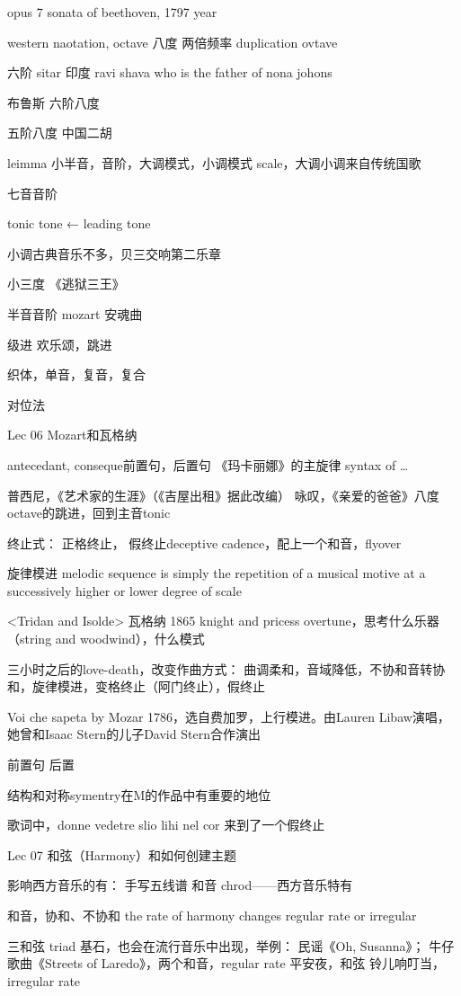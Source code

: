 opus 7 sonata of beethoven, 1797 year

western naotation, octave 八度 两倍频率 duplication ovtave

六阶 sitar 印度 ravi shava who is the father of nona johons

布鲁斯 六阶八度

五阶八度 中国二胡

leimma 小半音，音阶，大调模式，小调模式 scale，大调小调来自传统国歌

七音音阶

tonic tone ← leading tone

小调古典音乐不多，贝三交响第二乐章

小三度 《逃狱三王》

半音音阶 mozart 安魂曲

级进 欢乐颂，跳进

织体，单音，复音，复合

对位法


Lec 06 Mozart和瓦格纳

antecedant, conseque前置句，后置句
《玛卡丽娜》的主旋律 
syntax of …

普西尼，《艺术家的生涯》（《吉屋出租》据此改编）
咏叹，《亲爱的爸爸》八度octave的跳进，回到主音tonic

终止式：
正格终止，
假终止deceptive cadence，配上一个和音，flyover

旋律模进 melodic sequence is simply the repetition of a musical motive at a successively higher or lower degree of scale

<Tridan and Isolde> 瓦格纳 1865
knight and pricess
overtune，思考什么乐器（string and woodwind），什么模式

三小时之后的love-death，改变作曲方式：
曲调柔和，音域降低，不协和音转协和，旋律模进，变格终止（阿门终止），假终止

Voi che sapeta by Mozar 1786，选自费加罗，上行模进。由Lauren Libaw演唱，她曾和Isaac Stern的儿子David Stern合作演出

前置句 后置

结构和对称symentry在M的作品中有重要的地位

歌词中，donne vedetre slio lihi nel cor 来到了一个假终止


Lec 07 和弦（Harmony）和如何创建主题

影响西方音乐的有：
手写五线谱
和音 chrod——西方音乐特有

和音，协和、不协和
the rate of harmony changes regular rate or irregular

三和弦 triad 基石，也会在流行音乐中出现，举例：
民谣《Oh, Susanna》；
牛仔歌曲《Streets of Laredo》，两个和音，regular rate 
平安夜，和弦
铃儿响叮当，irregular rate

